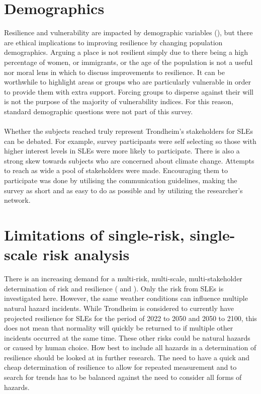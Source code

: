 \paragraph{}



\section{Demographics}
Resilience and vulnerability are impacted by demographic variables (\cite{rod_integrated_2012}), but there are ethical implications to improving resilience by changing population demographics. Arguing a place is not resilient simply due to there being a high percentage of women, or immigrants, or the age of the population is not a useful nor moral lens in which to discuss improvements to resilience. It can be worthwhile to highlight areas or groups who are particularly vulnerable in order to provide them with extra support. Forcing groups to disperse against their will is not the purpose of the majority of vulnerability indices. For this reason, standard demographic questions were not part of this survey. 


\paragraph{}
Whether the subjects reached truly represent Trondheim's stakeholders for SLEs can be debated. For example, survey participants were self selecting so those with higher interest levels in SLEs were more likely to participate. There is also a strong skew towards subjects who are concerned about climate change. Attempts to reach as wide a pool of stakeholders were made. Encouraging them to participate was done by utilising the communication guidelines, making the survey as short and as easy to do as possible and by utilizing the researcher's network. 



\section{Limitations of single-risk, single-scale risk analysis}
There is an increasing demand for a multi-risk, multi-scale, multi-stakeholder determination of risk and resilience (\cite{gerkensmeier_governing_2018} and \cite{cutter_community_2020}).  Only the risk from SLEs is investigated here. However, the same weather conditions can influence multiple natural hazard incidents. While Trondheim is considered to currently have projected resilience for SLEs for the period of 2022 to 2050 and 2050 to 2100, this does not mean that normality will quickly be returned to if multiple other incidents occurred at the same time. These other risks could be natural hazards or caused by human choice. How best to include all hazards in a determination of resilience should be looked at in further research. The need to have a quick and cheap determination of resilience to allow for repeated measurement and to search for trends has to be balanced against the need to consider all forms of hazards. 
